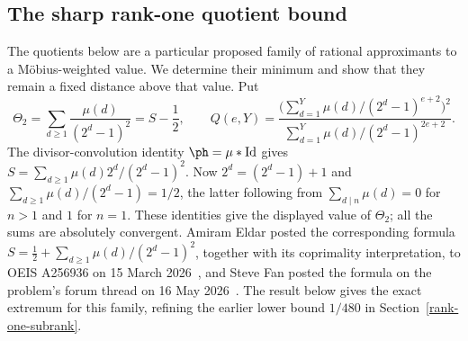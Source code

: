\subsection{The sharp rank-one quotient bound}\label{long249:r3-rankone}
The quotients below are a particular proposed family of rational
approximants to a M\"obius-weighted value. We determine their minimum
and show that they remain a fixed distance above that value. Put
\[
 \Theta_2=\sum_{d\ge1}\frac{\mu(d)}{(2^d-1)^2}=S-\frac12,
 \qquad
 Q(e,Y)=\frac{\bigl(\sum_{d=1}^{Y}\mu(d)/(2^d-1)^{e+2}\bigr)^2}
 {\sum_{d=1}^{Y}\mu(d)/(2^d-1)^{2e+2}}.
\]
The divisor-convolution identity $\ph=\mu*\mathrm{Id}$ gives
$S=\sum_{d\ge1}\mu(d)2^d/(2^d-1)^2$.
Now $2^d=(2^d-1)+1$ and
$\sum_{d\ge1}\mu(d)/(2^d-1)=1/2$, the latter following from
$\sum_{d\mid n}\mu(d)=0$ for $n>1$ and $1$ for $n=1$.
These identities give the displayed value of $\Theta_2$; all the sums are
absolutely convergent. Amiram Eldar posted the corresponding formula
$S=\tfrac12+\sum_{d\ge1}\mu(d)/(2^d-1)^2$, together with its coprimality
interpretation, to OEIS A256936 on 15 March 2026~\cite{eldar2026oeis}, and
Steve Fan posted the formula on the problem's forum thread on
16 May 2026~\cite{fan2026totient}. The result below gives the exact extremum for this family, refining
the earlier lower bound $1/480$ in Section~\ref{rank-one-subrank}.

